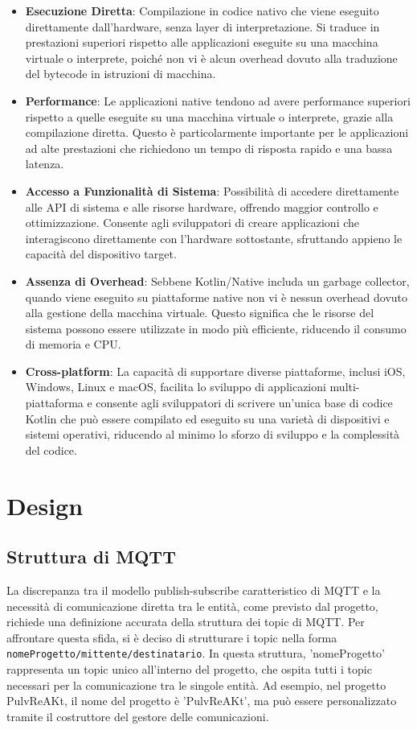 \documentclass[12pt,a4paper,openright,twoside]{book}
\begin{document}
\begin{itemize}
\item \textbf{Esecuzione Diretta}: Compilazione in codice nativo che viene eseguito direttamente dall'hardware, senza layer di interpretazione. 
Si traduce in prestazioni superiori rispetto alle applicazioni eseguite su una macchina virtuale o interprete, poiché non vi è alcun overhead dovuto alla traduzione 
del bytecode in istruzioni di macchina.
\item \textbf{Performance}: Le applicazioni native tendono ad avere performance superiori rispetto a quelle eseguite su una macchina virtuale o interprete, 
grazie alla compilazione diretta. Questo è particolarmente importante per le applicazioni ad alte prestazioni che richiedono un tempo di risposta rapido e una bassa latenza.
\item \textbf{Accesso a Funzionalità di Sistema}: Possibilità di accedere direttamente alle API di sistema e alle risorse hardware, offrendo maggior controllo e ottimizzazione. 
Consente agli sviluppatori di creare applicazioni che interagiscono direttamente con l'hardware sottostante, sfruttando appieno le capacità del dispositivo target.
\item \textbf{Assenza di Overhead}: Sebbene Kotlin/Native includa un garbage collector, quando viene eseguito su piattaforme native non vi è nessun overhead dovuto alla 
gestione della macchina virtuale. Questo significa che le risorse del sistema possono essere utilizzate in modo più efficiente, riducendo il consumo di memoria e CPU.
\item \textbf{Cross-platform}: La capacità di supportare diverse piattaforme, inclusi iOS, Windows, Linux e macOS, facilita lo sviluppo di applicazioni multi-piattaforma e 
consente agli sviluppatori di scrivere un'unica base di codice Kotlin che può essere compilato ed eseguito su una varietà di dispositivi e sistemi operativi, 
riducendo al minimo lo sforzo di sviluppo e la complessità del codice.
\end{itemize}

\chapter{Design}\label{chap:Design}

\section{Struttura di MQTT}

La discrepanza tra il modello publish-subscribe caratteristico di \ac{MQTT} e la necessità di comunicazione diretta tra le entità, come previsto dal progetto, richiede una definizione accurata 
della struttura dei topic di \ac{MQTT}. Per affrontare questa sfida, si è deciso di strutturare i topic nella forma \texttt{nomeProgetto/mittente/destinatario}. 
In questa struttura, 'nomeProgetto' rappresenta un topic unico all'interno del progetto, che ospita tutti i topic necessari per la comunicazione tra le singole entità. 
Ad esempio, nel progetto PulvReAKt, il nome del progetto è 'PulvReAKt', ma può essere personalizzato tramite il costruttore del gestore delle comunicazioni.
\end{document}
